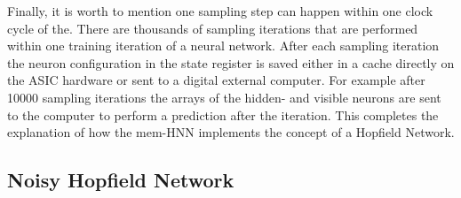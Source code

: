 Finally, it is worth to mention one sampling step can happen within one clock cycle of the. 
There are thousands of sampling iterations that are performed within one training iteration of a neural network.
After each sampling iteration the neuron configuration in the state register is saved either in a cache directly on the \ac{ASIC} hardware or
sent to a digital external computer. 
For example after 10000 sampling iterations the arrays of the hidden- and visible neurons are sent to the computer to perform a prediction after the iteration.
This completes the explanation of how the \ac{mem-HNN} implements the concept of a Hopfield Network. 


\subsection{Noisy Hopfield Network}

